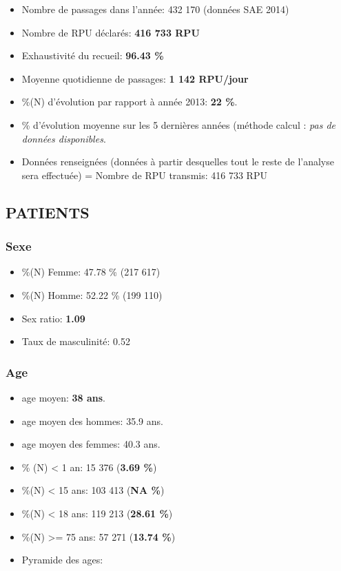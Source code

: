 \documentclass[]{article}
\begin{document}
\begin{itemize}
\itemsep1pt\parskip0pt
\item
  Nombre de passages dans l'année: 432 170 (données SAE 2014)
\item
  Nombre de RPU déclarés: \textbf{416 733 RPU}
\item
  Exhaustivité du recueil: \textbf{96.43 \%}
\item
  Moyenne quotidienne de passages: \textbf{1 142 RPU/jour}
\item
  \%(N) d'évolution par rapport à année 2013: \textbf{22 \%}.
\item
  \% d'évolution moyenne sur les 5 dernières années (méthode calcul :
  \emph{pas de données disponibles}.
\item
  Données renseignées (données à partir desquelles tout le reste de
  l'analyse sera effectuée) = Nombre de RPU transmis: 416 733 RPU
\end{itemize}

\subsection{PATIENTS}\label{patients}

\subsubsection{Sexe}\label{sexe}

\begin{itemize}
\itemsep1pt\parskip0pt
\item
  \%(N) Femme: 47.78 \% (217 617)
\item
  \%(N) Homme: 52.22 \% (199 110)
\item
  Sex ratio: \textbf{1.09}
\item
  Taux de masculinité: 0.52
\end{itemize}

\subsubsection{Age}\label{age}

\begin{itemize}
\item
  age moyen: \textbf{38 ans}.
\item
  age moyen des hommes: 35.9 ans.
\item
  age moyen des femmes: 40.3 ans.
\item
  \% (N) \textless{} 1 an: 15 376 (\textbf{3.69 \%})
\item
  \%(N) \textless{} 15 ans: 103 413 (\textbf{NA \%})
\item
  \%(N) \textless{} 18 ans: 119 213 (\textbf{28.61 \%})
\item
  \%(N) \textgreater{}= 75 ans: 57 271 (\textbf{13.74 \%})
\item
  Pyramide des ages:
\end{itemize}
\end{document}
